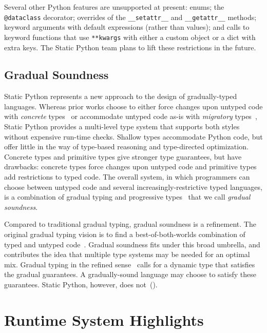 \documentclass[english,cleveref,crc]{programming}
\newcommand{\SP}{Static Python}
\newcommand{\code}[1]{\texttt{#1}}
\begin{document}
Several other Python features are unsupported at present:
enums; the \code{@dataclass} decorator;
overrides of the \code{\_\_setattr\_\_} and \code{\_\_getattr\_\_} methods;
keyword arguments with default expressions (rather than values); and
calls to keyword functions that use \code{**kwargs} with either
a custom object or a dict with extra keys.
The \SP{} team plans to lift these restrictions in the future.

\subsection{Gradual Soundness}
\label{s:gradual-soundness}

\SP{} represents a new approach to the design of gradually-typed
languages.
Whereas prior works choose to either force changes upon untyped code
with \emph{concrete} types~\cite{wzlov-popl-2010,mt-oopsla-2017}
or accommodate untyped code as-is with \emph{migratory}
types~\cite{st-sfp-2006,tfffgksst-snapl-2017}, \SP{} provides a multi-level
type system that supports both styles without expensive run-time checks.
Shallow types accommodate Python code, but offer little in the way
of type-based reasoning and type-directed optimization.
Concrete types and primitive types give stronger type guarantees, but have
drawbacks:
concrete types force changes upon untyped code and primitive types
add restrictions to typed code.
The overall system, in which programmers can choose between untyped code
and several increasingly-restrictive typed languages,
is a combination of gradual typing and progressive
types~\cite{pqk-onward-2012} that we call \emph{gradual soundness}.

Compared to traditional gradual typing, gradual soundness is a refinement.
The original gradual typing vision is to find a best-of-both-worlds combination
of typed and untyped code~\cite{st-sfp-2006,tf-dls-2006,mf-toplas-2009,gktff-sfp-2006}.
Gradual soundness fits under this broad umbrella, and contributes the idea that multiple
type systems may be needed for an optimal mix.
Gradual typing in the refined sense~\cite{svcb-snapl-2015} calls for a dynamic
type that satisfies the gradual guarantees.
A gradually-sound language may choose to satisfy these guarantees.
\SP{}, however, does not~().


\section{Runtime System Highlights}
\label{s:runtime}
\end{document}
